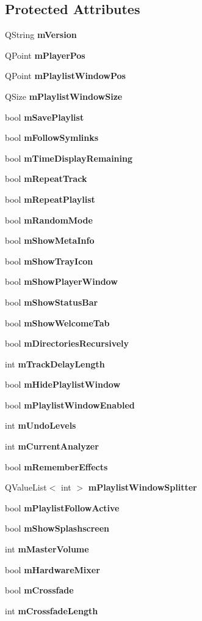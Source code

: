 \subsection*{Protected Attributes}
\begin{CompactItemize}
\item 
QString {\bf m\-Version}
\item 
QPoint {\bf m\-Player\-Pos}
\item 
QPoint {\bf m\-Playlist\-Window\-Pos}
\item 
QSize {\bf m\-Playlist\-Window\-Size}
\item 
bool {\bf m\-Save\-Playlist}
\item 
bool {\bf m\-Follow\-Symlinks}
\item 
bool {\bf m\-Time\-Display\-Remaining}
\item 
bool {\bf m\-Repeat\-Track}
\item 
bool {\bf m\-Repeat\-Playlist}
\item 
bool {\bf m\-Random\-Mode}
\item 
bool {\bf m\-Show\-Meta\-Info}
\item 
bool {\bf m\-Show\-Tray\-Icon}
\item 
bool {\bf m\-Show\-Player\-Window}
\item 
bool {\bf m\-Show\-Status\-Bar}
\item 
bool {\bf m\-Show\-Welcome\-Tab}
\item 
bool {\bf m\-Directories\-Recursively}
\item 
int {\bf m\-Track\-Delay\-Length}
\item 
bool {\bf m\-Hide\-Playlist\-Window}
\item 
bool {\bf m\-Playlist\-Window\-Enabled}
\item 
int {\bf m\-Undo\-Levels}
\item 
int {\bf m\-Current\-Analyzer}
\item 
bool {\bf m\-Remember\-Effects}
\item 
QValue\-List$<$ int $>$ {\bf m\-Playlist\-Window\-Splitter}
\item 
bool {\bf m\-Playlist\-Follow\-Active}
\item 
bool {\bf m\-Show\-Splashscreen}
\item 
int {\bf m\-Master\-Volume}
\item 
bool {\bf m\-Hardware\-Mixer}
\item 
bool {\bf m\-Crossfade}
\item 
int {\bf m\-Crossfade\-Length}
\item 

\end{CompactItemize}

